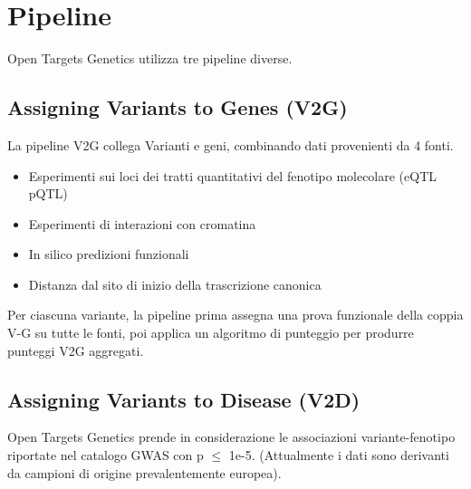 \documentclass{article}
\begin{document}
\section{Pipeline}
Open Targets Genetics utilizza tre pipeline diverse.
\subsection{Assigning Variants to Genes (V2G)}
La pipeline V2G collega Varianti e geni, combinando dati provenienti da 4 fonti. 
\begin{itemize}
    \item Esperimenti sui loci dei tratti quantitativi del fenotipo molecolare (eQTL pQTL)
    \item Esperimenti di interazioni con cromatina
    \item In silico predizioni funzionali
    \item Distanza dal sito di inizio della trascrizione canonica
\end{itemize} 
Per ciascuna variante, la pipeline prima assegna una prova funzionale della coppia V-G su tutte le fonti, poi applica un algoritmo di punteggio per produrre punteggi V2G aggregati. 
\subsection{Assigning Variants to Disease (V2D)}
Open Targets Genetics prende in considerazione le associazioni variante-fenotipo riportate nel catalogo GWAS con p $\leq$ 1e-5. 
(Attualmente i dati sono derivanti da campioni di origine prevalentemente europea). 
\end{document}
